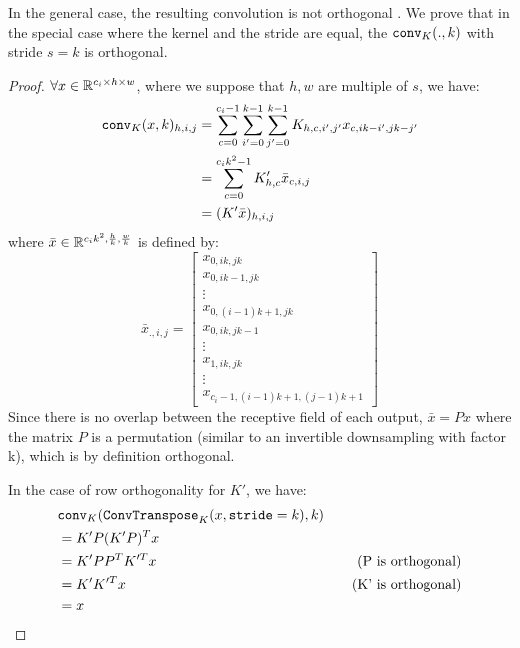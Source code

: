     In the general case, the resulting convolution is not orthogonal \cite{achour2023existencestabilityscalabilityorthogonal}. We prove that in the special case where the kernel and the stride are equal, the $\mathtt{conv}_{K}(., k)$ with stride $s=k$  is orthogonal.

    
        \begin{proof}
        $\forall x\in\mathbb{R}^{c_i\times h\times w}$, where we suppose that $h,w$ are multiple of $s$, we have:
        \begin{align*}
            \mathtt{conv}_{K}(x, k)_{h,i,j}            &= \sum_{c = 0}^{c_{i}-1} \sum_{i' = 0}^{k - 1} \sum_{j' = 0}^{k - 1} K_{h,c,i',j'}x_{c,ik-i',jk-j'} \\
            &=  \sum_{c = 0}^{c_{i}k^2-1} K'_{h,c}\bar{x}_{c,i,j} \\
            &= (K'\bar{x})_{h,i,j}
        \end{align*}
        where $\bar{x} \in\mathbb{R}^{c_ik^2,\frac{h}{k},\frac{w}{k}}$ is defined by:
        \[
        \bar{x}_{.,i,j} = \begin{bmatrix}x_{0,ik,jk}\\x_{0,ik-1,jk}\\ \vdots \\ x_{0,(i-1)k+1,jk}\\ x_{0,ik,jk-1}\\ \vdots \\ x_{1,ik,jk}\\ \vdots \\ x_{c_i-1,(i-1)k+1,(j-1)k+1}\end{bmatrix} 
        \]
        Since there is no overlap between the receptive field of each output, $\bar{x}=Px$ where the matrix $P$ is a permutation (similar to an invertible downsampling with factor k), which is by definition orthogonal.

        In the case of row orthogonality for $K'$, we have:
\begin{align*}
    &\mathtt{conv}_{K}(\mathtt{ConvTranspose}_{K}(x, \mathtt{stride}=k), k) \\
    &= K'P(K'P)^Tx \\
    &= K'PP^TK'^Tx  & \quad \text{(P is orthogonal)}\\ 
    &= K'K'^Tx & \quad \text{(K' is orthogonal)}\\
    &= x
\end{align*}

        \end{proof}

